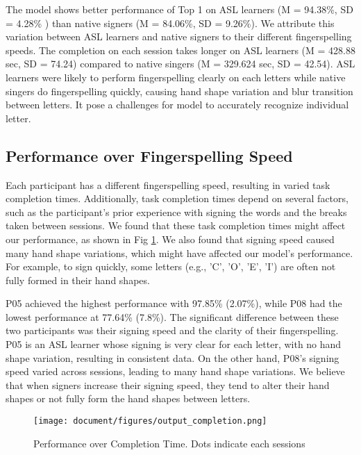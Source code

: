 The model shows better performance of Top 1 on ASL learners (M = 94.38\%, SD = 4.28\% ) than native signers (M = 84.06\%, SD = 9.26\%). We attribute this variation between ASL learners and native signers to their different fingerspelling speeds. The completion on each session takes longer on ASL learners  (M = 428.88 sec, SD = 74.24) compared to native singers (M = 329.624 sec, SD = 42.54). ASL learners were likely to perform fingerspelling clearly on each letters while native singers do fingerspelling quickly, causing hand shape variation and blur transition between letters. It pose a challenges for model to accurately recognize individual letter. 






\subsection{Performance over Fingerspelling Speed}
Each participant has a different fingerspelling speed, resulting in varied task completion times. Additionally, task completion times depend on several factors, such as the participant's prior experience with signing the words and the breaks taken between sessions. We found that these task completion times might affect our performance, as shown in Fig \ref{fig:performance_time}. We also found that signing speed caused many hand shape variations, which might have affected our model's performance. For example, to sign quickly, some letters (e.g., 'C', 'O', 'E', 'I') are often not fully formed in their hand shapes.

P05 achieved the highest performance with 97.85\% (2.07\%), while P08 had the lowest performance at 77.64\% (7.8\%). The significant difference between these two participants was their signing speed and the clarity of their fingerspelling. P05 is an ASL learner whose signing is very clear for each letter, with no hand shape variation, resulting in consistent data. On the other hand, P08's signing speed varied across sessions, leading to many hand shape variations. We believe that when signers increase their signing speed, they tend to alter their hand shapes or not fully form the hand shapes between letters. 


\begin{figure}
  \texttt{[image: document/figures/output\_completion.png]}
  \caption{Performance over Completion Time. Dots indicate each sessions }
  \Description{}
  \label{fig:performance_time}
\end{figure}
